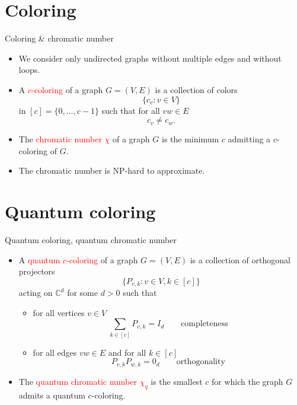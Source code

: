 \documentclass{beamer}
\newcommand{\C}{\mathbb{C}}
\renewcommand{\>}{\rangle}
\newcommand{\<}{\langle}
\begin{document}
\section{Coloring}

\begin{frame}{Coloring \& chromatic number}

\begin{itemize}
\item We consider only undirected graphs without multiple edges and without loops.

\item A \textcolor{red}{$c$-coloring} of a graph $G=(V,E)$ is a collection of colors 
\[
\{ c_v : v \in V\}
\]
in $[c]=\{0,\ldots,c-1\}$ such that for all $vw\in E$
\[
c_v \neq c_w.
\]

\item The \textcolor{red}{chromatic number $\chi$} of a graph $G$ is the minimum $c$ admitting a $c$-coloring of $G$.

\item The chromatic number is NP-hard to approximate. 
\end{itemize}
\end{frame}

%

\section{Quantum coloring}

\begin{frame}{Quantum coloring, quantum chromatic number}

\begin{itemize}
\item A \textcolor{red}{quantum $c$-coloring} of a graph $G=(V,E)$ is a collection of orthogonal projectors 
\[
\{ P_{v,k} : v \in V, k \in [c] \}
\]
acting on $\C^d$ for some $d>0$ such that
\begin{itemize}
\item for all vertices $v\in V$
\[
\sum_{k\in [c]} P_{v,k} = I_d \quad \quad \mbox{completeness}
\]
\item for all edges $vw\in E$ and for all $k\in [c]$
\[
P_{v,k} P_{w,k} = 0_d \quad \quad \mbox{orthogonality}
\]
\end{itemize}

\item The \textcolor{red}{quantum chromatic number $\chi_q$} is the smallest $c$ for which the graph $G$ admits a quantum $c$-coloring.

\end{itemize}

\end{frame}
\end{document}
